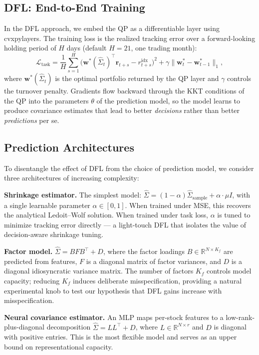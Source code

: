 \documentclass[11pt]{article}
\begin{document}
\subsection{DFL: End-to-End Training}

In the DFL approach, we embed the QP as a differentiable layer using cvxpylayers. The training loss is the realized tracking error over a forward-looking holding period of $H$ days (default $H=21$, one trading month):
\[
  \mathcal{L}_{\mathrm{task}}
    = \frac{1}{H}\sum_{s=1}^{H}\bigl(\mathbf{w}^*(\hat{\Sigma}_t)^\top \mathbf{r}_{t+s}
      - r_{t+s}^{\mathrm{idx}}\bigr)^2
      + \gamma \|\mathbf{w}^*_t - \mathbf{w}^*_{t-1}\|_1,
\]
where $\mathbf{w}^*(\hat{\Sigma}_t)$ is the optimal portfolio returned by the QP layer and $\gamma$ controls the turnover penalty. Gradients flow backward through the KKT conditions of the QP into the parameters $\theta$ of the prediction model, so the model learns to produce covariance estimates that lead to better \emph{decisions} rather than better \emph{predictions} per se.

\subsection{Prediction Architectures}

To disentangle the effect of DFL from the choice of prediction model, we consider three architectures of increasing complexity:

\textbf{Shrinkage estimator.}\; The simplest model: $\hat{\Sigma} = (1-\alpha)\hat{\Sigma}_{\mathrm{sample}} + \alpha \cdot \mu I$, with a single learnable parameter $\alpha \in [0,1]$. When trained under MSE, this recovers the analytical Ledoit--Wolf solution. When trained under task loss, $\alpha$ is tuned to minimize tracking error directly --- a light-touch DFL that isolates the value of decision-aware shrinkage tuning.
\label{sec:shrinkage}

\textbf{Factor model.}\; $\hat{\Sigma} = BFB^\top + D$, where the factor loadings $B \in \mathbb{R}^{N \times K_f}$ are predicted from features, $F$ is a diagonal matrix of factor variances, and $D$ is a diagonal idiosyncratic variance matrix. The number of factors $K_f$ controls model capacity; reducing $K_f$ induces deliberate misspecification, providing a natural experimental knob to test our hypothesis that DFL gains increase with misspecification.

\textbf{Neural covariance estimator.}\; An MLP maps per-stock features to a low-rank-plus-diagonal decomposition $\hat{\Sigma} = LL^\top + D$, where $L \in \mathbb{R}^{N \times r}$ and $D$ is diagonal with positive entries. This is the most flexible model and serves as an upper bound on representational capacity.
\end{document}
